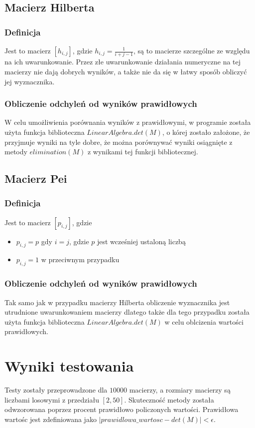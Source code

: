 \documentclass{article}
\begin{document}
\subsection{Macierz Hilberta}

\subsubsection{Definicja}
Jest to macierz $[h_{i,j}]$, gdzie $h_{i,j}=\frac{1}{i+j-1}$, są to macierze szczególne ze względu na ich uwarunkowanie. Przez złe uwarunkowanie działania numeryczne na tej macierzy nie dają dobrych wyników, a także nie da się w łatwy sposób obliczyć jej wyznacznika.

\subsubsection{Obliczenie odchyleń od wyników prawidłowych}
W celu umożliwienia porównania wyników z prawidłowymi, w programie została użyta funkcja biblioteczna $LinearAlgebra.det(M)$, o kórej zostało założone, że przyjmuje wyniki na tyle dobre, że można porównywać wyniki osiągnięte z metody $elimination(M)$ z wynikami tej funkcji bibliotecznej.

\subsection{Macierz Pei}
\subsubsection{Definicja}
Jest to macierz $[p_{i,j}]$, gdzie
\begin{itemize}
    \item $p_{i,j}=p$ gdy $i=j$, gdzie $p$ jest wcześniej ustaloną liczbą
    \item $p_{i,j}=1$ w przeciwnym przypadku
\end{itemize}


\subsubsection{Obliczenie odchyleń od wyników prawidłowych}
Tak samo jak w przypadku macierzy Hilberta obliczenie wyznacznika jest utrudnione uwarunkowaniem macierzy dlatego także dla tego przypadku została użyta funkcja biblioteczna $LinearAlgebra.det(M)$ w celu oblcizenia wartości prawidłowych.

\section{Wyniki testowania}
Testy zostały przeprowadzone dla $10 000$ macierzy, a rozmiary macierzy są liczbami losowymi z przedziału $[2,50]$. Skuteczność metody została odwzorowana poprzez procent prawidłowo policzonych wartości. Prawidłowa wartośc jest zdefiniowana jako 
\newline
$|prawidlowa\_wartosc - det(M)|<\epsilon$.
\end{document}

